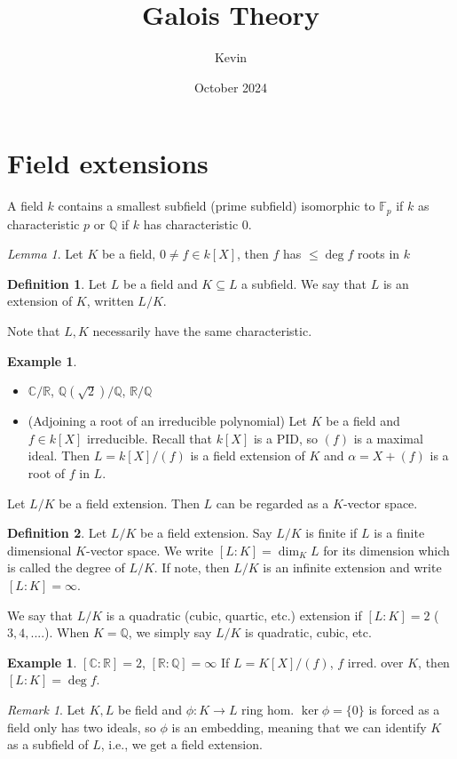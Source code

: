 \documentclass{article}
\title{Galois Theory}
\author{Kevin}
\date{October 2024}
\theoremstyle{definition}
\newtheorem*{defn*}{Definition}
\newtheorem{example}[defn]{Example}
\theoremstyle{remark}
\newtheorem{rem}{Remark}
\newtheorem{lem}[defn]{Lemma}
\theoremstyle{plain}
\newcommand{\QQ}{\mathbb{Q}}
\newcommand{\RR}{\mathbb{R}}
\newcommand{\CC}{\mathbb{C}}
\newcommand{\FF}{\mathbb{F}}
\begin{document}
\maketitle
\section{Field extensions}
A field $k$ contains a smallest subfield (prime subfield) isomorphic to $\FF_p$ if $k$ as characteristic $p$ or $\QQ$ if $k$ has characteristic $0$.
\begin{lem}
    Let $K$ be a field, $0\neq f\in k[X]$, then $f$ has $\le\deg f$ roots in $k$
\end{lem}
\begin{defn*}
Let $L$ be a field and $K\subseteq L$ a subfield. We say that $L$ is an extension of $K$, written $L/K$.
\end{defn*}
Note that $L, K$ necessarily have the same characteristic.
\begin{example}
    \begin{itemize}
        \item $\CC/\RR$, $\QQ(\sqrt{2})/\QQ$, $\RR/\QQ$
        \item (Adjoining a root of an irreducible polynomial) Let $K$ be a field and $f\in k[X]$ irreducible. Recall that $k[X]$ is a PID, so $(f)$ is a maximal ideal. Then $L=k[X]/(f)$ is a field extension of $K$ and $\alpha=X+(f)$ is a root of $f$ in $L$.
    \end{itemize}
\end{example}
Let $L/K$ be a field extension. Then $L$ can be regarded as a $K$-vector space.
\begin{defn*}
    Let $L/K$ be a field extension. Say $L/K$ is finite if $L$ is a finite dimensional $K$-vector space. We write $[L:K]=\dim_KL$ for its dimension which is called the degree of $L/K$. If note, then $L/K$ is an infinite extension and write $[L:K]=\infty$.
\end{defn*}
We say that $L/K$ is a quadratic (cubic, quartic, etc.) extension if $[L:K]=2$ ($3,4,....$). When $K=\QQ$, we simply say $L/K$ is quadratic, cubic, etc.
\begin{example}
    $[\CC:\RR]=2$, $[\RR:\QQ]=\infty$
    If $L=K[X]/(f)$, $f$ irred. over $K$, then $[L:K]=\deg f$.
\end{example}
\begin{rem}
    Let $K,L$ be field and $\phi:K\to L$ ring hom. $\ker\phi=\{0\}$ is forced as a field only has two ideals, so $\phi$ is an embedding, meaning that we can identify $K$ as a subfield of $L$, i.e., we get a field extension.
\end{rem}
\end{document}
